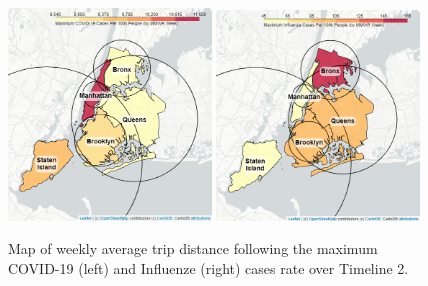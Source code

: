 \documentclass[11pt]{article}
\begin{document}
\begin{figure}[H]

    \centering

    \includegraphics[width=0.48\textwidth]{../plots/cropped-map-avg-trip-distance-at-max-covid-by-pu_borough.png}
    \includegraphics[width=0.48\textwidth]{../plots/cropped-map-avg-trip-distance-at-max-flu-by-pu_borough.png}

    \caption{Map of weekly average trip distance following the maximum COVID-19 (left) and Influenze (right) cases rate over Timeline 2.} %
    \label{maps}
\end{figure}
\end{document}
